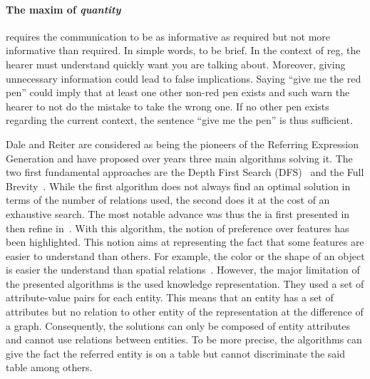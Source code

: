 \paragraph{The maxim of \textit{quantity}} requires the communication to be as informative as required but not more informative than required. In simple words, to be brief. In the context of \acrshort{reg}, the hearer must understand quickly want you are talking about. Moreover, giving unnecessary information could lead to false implications. Saying ``give me the red pen'' could imply that at least one other non-red pen exists and such warn the hearer to not do the mistake to take the wrong one. If no other pen exists regarding the current context, the sentence ``give me the pen'' is thus sufficient.

Dale and Reiter are considered as being the pioneers of the Referring Expression Generation and have proposed over years three main algorithms solving it. The two first fundamental approaches are the Depth First Search (DFS)~\cite{dale_1989_cooking} and the Full Brevity~\cite{dale_1992_generating}. While the first algorithm does not always find an optimal solution in terms of the number of relations used, the second does it at the cost of an exhaustive search. The most notable advance was thus the \acrfull{ia} first presented in~\cite{reiter_1992_fast} then refine in~\cite{dale_1995_computational}. With this algorithm, the notion of preference over features has been highlighted. This notion aims at representing the fact that some features are easier to understand than others. For example, the color or the shape of an object is easier the understand than spatial relations~\cite{belke_2002_tracking}. However, the major limitation of the presented algorithms is the used knowledge representation. They used a set of attribute-value pairs for each entity. This means that an entity has a set of attributes but no relation to other entity of the representation at the difference of a graph. Consequently, the solutions can only be composed of entity attributes and cannot use relations between entities. To be more precise, the algorithms can give the fact the referred entity is on a table but cannot discriminate the said table among others.

